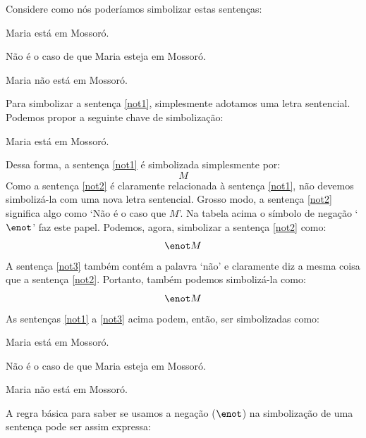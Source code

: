 Considere como nós poderíamos simbolizar estas sentenças:
	\begin{earg}
	\item[\ex{not1}] Maria está em Mossoró.
	\item[\ex{not2}] Não é o caso de que Maria esteja em Mossoró.
	\item[\ex{not3}] Maria não está em Mossoró.
	\end{earg}
Para simbolizar a sentença \ref{not1}, simplesmente adotamos uma letra sentencial.
Podemos propor a seguinte chave de simbolização:
	\begin{ekey}
		\item[M] Maria está em Mossoró.
	\end{ekey}
Dessa forma, a sentença \ref{not1} é simbolizada simplesmente por:
$$M$$
Como a sentença \ref{not2} é claramente relacionada à sentença \ref{not1}, não devemos simbolizá-la com uma nova letra sentencial.
Grosso modo, a sentença \ref{not2} significa algo como `Não é o caso que $M$'.
Na tabela acima o símbolo de negação `$\enot$' faz este papel.
Podemos, agora, simbolizar a sentença \ref{not2} como:
$$\enot M$$
A sentença \ref{not3} também contém a palavra `não' e claramente diz a mesma coisa que a sentença \ref{not2}.
Portanto, também podemos simbolizá-la como:
$$\enot M$$
As sentenças \ref{not1} a \ref{not3} acima podem, então, ser simbolizadas como:
	\begin{ekey}
		\item[M] Maria está em Mossoró.
		\item[$\enot$M] Não é o caso de que Maria esteja em Mossoró.
		\item[$\enot$M] Maria não está em Mossoró.
	\end{ekey}
A regra básica para saber se usamos a negação ($\enot$) na simbolização de uma sentença pode ser assim expressa:

